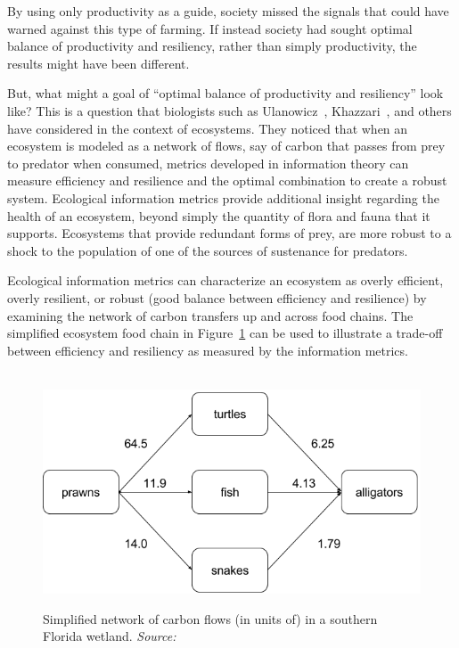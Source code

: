\documentclass{article}
\begin{document}

By using only productivity
as a guide, society missed the signals that could
have warned against this type of farming. If
instead society had sought optimal 
balance of productivity and resiliency, rather than simply
productivity, the results might have been different.

But, what might a goal of ``optimal balance of productivity
and resiliency'' look like? This is a question that biologists 
such as Ulanowicz~\citet{ulanowicz_quantifying_2009},
Khazzari~\citet{}, and others have considered in the
context of ecosystems. They noticed that when an 
ecosystem is modeled as
a network of flows, say of carbon that passes from prey
to predator when consumed, metrics developed
in information theory can measure efficiency and 
resilience and the optimal combination to create a
robust system. Ecological information metrics
provide additional insight regarding the health
of an ecosystem, beyond simply the quantity of 
flora and fauna that it supports. Ecosystems
that provide redundant forms of prey,
are more robust to a shock to the population of one of 
the sources of sustenance for predators. 

Ecological information
metrics can characterize an ecosystem as overly
efficient, overly resilient, or robust (good balance between
efficiency and resilience) by
examining the network of carbon transfers 
up and across food chains. The simplified
ecosystem food chain in Figure~\ref{fig:ulano_ex}
can be used to illustrate a trade-off between 
efficiency and resiliency as measured by
the information metrics.

\begin{figure}
\centering\
\includegraphics[width=.9\linewidth]{Ulano_ex.png}
\caption{Simplified network of carbon flows (in units of) 
in a southern Florida wetland. 
\textit{Source:~\cite{ulanowicz_quantifying_2009}}}
\label{fig:ulano_ex}
\end{figure}
\end{document}
